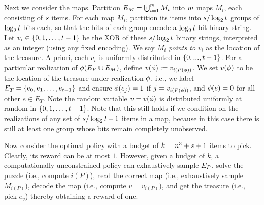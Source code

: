 \begin{proofof}{}
Next we consider the maps.  
Partition $E_{M}=\biguplus_{i=1}^{m}M_{i}$ into $m$
maps $M_{i}$, each consisting of $s$ items.
For each map $M_{i}$, partition
its items into $s/\log_{2} t$ groups of $\log_{2}
t$ bits each, so that the bits of each group encode a 
$\log_{2} t$ bit binary string.
Let $v_{i} \in \left\{0,1,\ldots,t-1\right\}$ be the XOR of these $s/\log_{2} t$
binary strings, interpreted as an integer (using any fixed encoding). 
We say
$M_{i}$ \emph{points to} $v_{i}$ as the location of the treasure.
A priori, each $v_{i}$ is uniformly distributed in $\{0,...,t-1\}$. For a
particular realization of ${\color{black}{\ensuremath{\phi}}}(E_{P}\cup E_{M})$,
define $v({\color{black}{\ensuremath{\phi}}}) := v_{i(P({\color{black}{\ensuremath{\phi}}}))}$.  We set $v({\color{black}{\ensuremath{\phi}}})$ to be the location of the
treasure under realization ${\color{black}{\ensuremath{\phi}}}$, i.e., we label $E_{T} = \left\{e_0,e_1,\ldots, e_{t-1}\right\}$ and ensure 
${\color{black}{\ensuremath{\phi}}}(e_{j}) = 1$ if $j = v_{i(P({\color{black}{\ensuremath{\phi}}}))}$, and ${\color{black}{\ensuremath{\phi}}}(e) = 0$ for
all other $e \in E_{T}$.
%
Note the random variable $v = v({\color{black}{\ensuremath{\phi}}})$ is distributed
uniformly at random in $\{0,1,\dots,t-1\}$.  Note that this still holds
if we condition on the realizations of any set of $s/\log_{2} t - 1$
items in a map, because in this case there is still at least one group
whose bits remain completely unobserved.


Now consider the optimal policy with a budget of $k=n^{3}+s+1$ items to pick.
Clearly, its reward can be at most $1$.  However, given a budget of $k$, 
a computationally unconstrained policy can exhaustively sample
$E_{P}$, solve the puzzle (i.e., compute $i(P)$), read the
correct map (i.e., exhaustively sample $M_{i(P)}$), decode the map
(i.e., compute $v=v_{i(P)}$), and get the treasure (i.e., pick
$e_{v}$) thereby obtaining a reward of one. 



\end{proofof}
